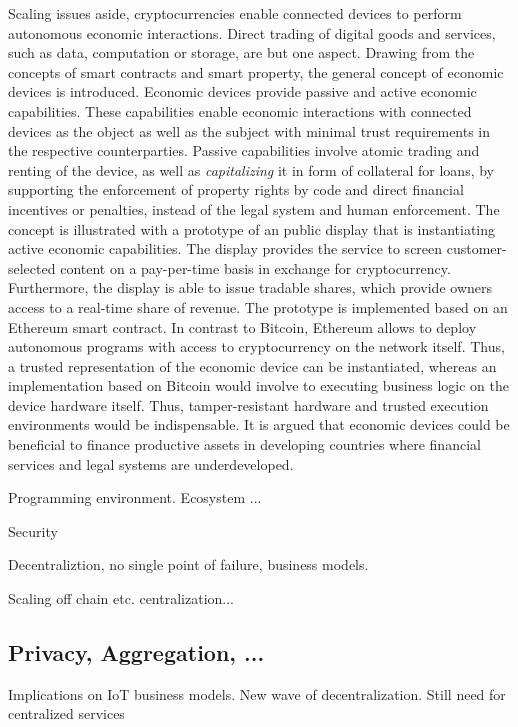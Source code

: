 Scaling issues aside, cryptocurrencies enable connected devices to perform autonomous economic interactions. Direct trading of digital goods and services, such as data, computation or storage, are but one aspect. Drawing from the concepts of smart contracts and smart property, the general concept of economic devices is introduced. Economic devices provide passive and active economic capabilities. These capabilities enable economic interactions with connected devices as the object as well as the subject with minimal trust requirements in the respective counterparties. 
Passive capabilities involve atomic trading and renting of the device, as well as \emph{capitalizing} it in form of collateral for loans, by supporting the enforcement of property rights by code and direct financial incentives or penalties, instead of the legal system and human enforcement. The concept is illustrated with a prototype of an public display that is instantiating active economic capabilities. The display provides the service to screen customer-selected content on a pay-per-time basis in exchange for cryptocurrency. Furthermore, the display is able to issue tradable shares, which provide owners access to a real-time share of revenue. The prototype is implemented based on an Ethereum smart contract. In contrast to Bitcoin, Ethereum allows to deploy autonomous programs with access to cryptocurrency on the network itself. Thus, a trusted representation of the economic device can be instantiated, whereas an implementation based on Bitcoin would involve to executing business logic on the device hardware itself. Thus, tamper-resistant hardware and trusted execution environments would be indispensable. It is argued that economic devices could be beneficial to finance productive assets in developing countries where financial services and legal systems are underdeveloped.



Programming environment. Ecosystem ...

Security 

Decentraliztion, no single point of failure, business models.


Scaling off chain etc. centralization...


\subsection{Privacy, Aggregation, ...}

Implications on IoT business models. New wave of decentralization. Still need for centralized services

